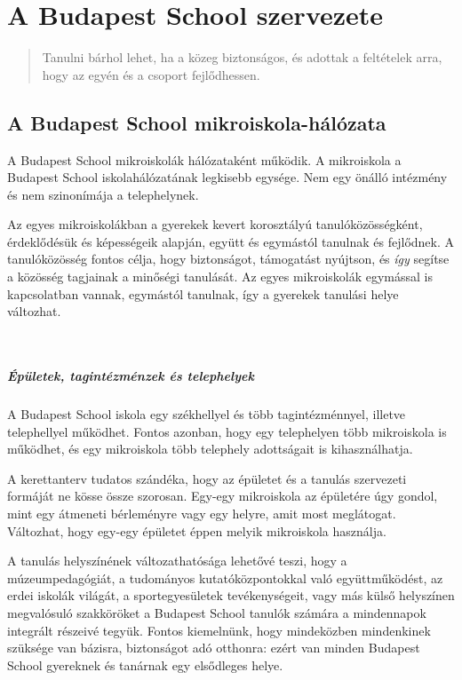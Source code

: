
\chapter{A Budapest School szervezete}
\begin{quote}
Tanulni bárhol lehet, ha a közeg biztonságos, és adottak a feltételek arra, hogy az egyén és a csoport fejlődhessen.
\end{quote}

\section{A Budapest School mikroiskola-hálózata}

 A Budapest School mikroiskolák hálózataként működik. A mikroiskola a Budapest School iskolahálózatának legkisebb egysége. Nem egy önálló intézmény és nem szinonímája a telephelynek.

Az egyes mikroiskolákban a gyerekek kevert korosztályú tanulóközösségként,
érdeklődésük és képességeik alapján, együtt és egymástól tanulnak és fejlődnek.
A tanulóközösség fontos célja, hogy biztonságot, támogatást nyújtson, és \emph{így} segítse a közösség tagjainak a minőségi tanulását. Az egyes mikroiskolák egymással is kapcsolatban vannak,
egymástól tanulnak, így a gyerekek tanulási helye változhat.

 \paragraph{Épületek, tagintézménzek és telephelyek}
A Budapest School iskola egy székhellyel és több tagintézménnyel, illetve telephellyel működhet. Fontos azonban, hogy egy telephelyen több mikroiskola is működhet, és egy mikroiskola több telephely adottságait is kihasználhatja.

A kerettanterv tudatos szándéka, hogy az épületet és a
tanulás szervezeti formáját ne kösse össze szorosan. Egy-egy mikroiskola az épületére úgy gondol, mint egy átmeneti bérleményre vagy egy helyre, amit most meglátogat.
Változhat, hogy egy-egy épületet éppen melyik mikroiskola használja.

A tanulás helyszínének változathatósága lehetővé teszi, hogy a múzeumpedagógiát, a tudományos kutatóközpontokkal való együttműködést, az erdei iskolák világát, a sportegyesületek tevékenységeit, vagy más külső helyszínen megvalósuló szakköröket a Budapest School tanulók számára a mindennapok integrált részeivé tegyük. Fontos kiemelnünk, hogy mindeközben mindenkinek szüksége van bázisra, biztonságot adó otthonra: ezért van minden Budapest School gyereknek és tanárnak egy elsődleges helye.

